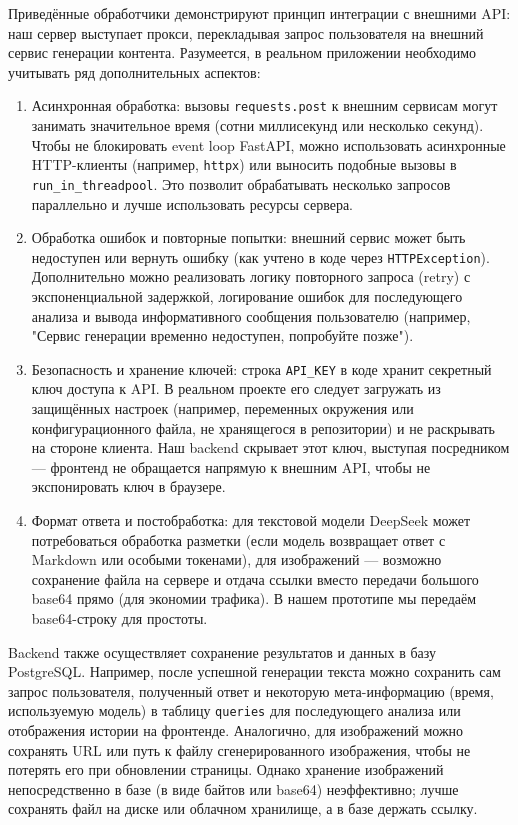 Приведённые обработчики демонстрируют принцип интеграции с внешними API: наш сервер выступает прокси, перекладывая запрос пользователя на внешний сервис генерации контента. Разумеется, в реальном приложении необходимо учитывать ряд дополнительных аспектов:
\begin{enumerate}[label=\arabic*]
\item Асинхронная обработка: вызовы \verb|requests.post| к внешним сервисам могут занимать значительное время (сотни миллисекунд или несколько секунд). Чтобы не блокировать event loop FastAPI, можно использовать асинхронные HTTP-клиенты (например, \verb|httpx|) или выносить подобные вызовы в \verb|run_in_threadpool|. Это позволит обрабатывать несколько запросов параллельно и лучше использовать ресурсы сервера.
\item Обработка ошибок и повторные попытки: внешний сервис может быть недоступен или вернуть ошибку (как учтено в коде через \verb|HTTPException|). Дополнительно можно реализовать логику повторного запроса (retry) с экспоненциальной задержкой, логирование ошибок для последующего анализа и вывода информативного сообщения пользователю (например, "Сервис генерации временно недоступен, попробуйте позже").
\item Безопасность и хранение ключей: строка \verb|API_KEY| в коде хранит секретный ключ доступа к API. В реальном проекте его следует загружать из защищённых настроек (например, переменных окружения или конфигурационного файла, не хранящегося в репозитории) и не раскрывать на стороне клиента. Наш backend скрывает этот ключ, выступая посредником — фронтенд не обращается напрямую к внешним API, чтобы не экспонировать ключ в браузере.
\item Формат ответа и постобработка: для текстовой модели DeepSeek может потребоваться обработка разметки (если модель возвращает ответ с Markdown или особыми токенами), для изображений — возможно сохранение файла на сервере и отдача ссылки вместо передачи большого base64 прямо (для экономии трафика). В нашем прототипе мы передаём base64-строку для простоты.
\end{enumerate}

Backend также осуществляет сохранение результатов и данных в базу PostgreSQL. Например, после успешной генерации текста можно сохранить сам запрос пользователя, полученный ответ и некоторую мета-информацию (время, используемую модель) в таблицу \verb|queries| для последующего анализа или отображения истории на фронтенде. Аналогично, для изображений можно сохранять URL или путь к файлу сгенерированного изображения, чтобы не потерять его при обновлении страницы. Однако хранение изображений непосредственно в базе (в виде байтов или base64) неэффективно; лучше сохранять файл на диске или облачном хранилище, а в базе держать ссылку.

